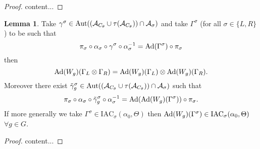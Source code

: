 \documentclass[12pt,a4paper,twoside]{article}
\let\originalleft\left
\let\originalright\right
\renewcommand{\left}{\mathopen{}\mathclose\bgroup\originalleft}
\renewcommand{\right}{\aftergroup\egroup\originalright}
\renewcommand{\AA}{\mathcal A}
\newcommand{\Ad}[1]{\textrm{Ad}\left(#1\right)}
\newcommand{\Aut}[1]{\textrm{Aut}\left(#1\right)}
\theoremstyle{definition}
\newtheorem{lemma}[theorem]{Lemma}
\numberwithin{equation}{section}
\begin{document}
\begin{proof}
	content...
\end{proof}
\begin{lemma}\label{lem:AdjointOverConeIsInCone}
	Take $\gamma^{\sigma}\in\Aut{(\AA_{C_\theta}\cup\tau(\AA_{C_\theta}))\cap\AA_{\sigma}}$ and take $\Gamma^{\sigma}$ (for all $\sigma\in\{L,R\}$) to be such that
	\begin{equation}
		\pi_{\sigma}\circ\alpha_{\sigma}\circ\gamma^{\sigma}\circ\alpha_{\sigma}^{-1}= \Ad{\Gamma^{\sigma}}\circ\pi_{\sigma}
	\end{equation}
	then
	\begin{equation}
		\Ad{W_g}(\Gamma_{L}\otimes\Gamma_{R})=\Ad{W_g}(\Gamma_L)\otimes\Ad{W_g}(\Gamma_{R}).
	\end{equation}
	Moreover there exist $\tilde\gamma^{\sigma}_g\in\Aut{(\AA_{C_\theta}\cup\tau(\AA_{C_\theta}))\cap\AA_{\sigma}}$ such that
	\begin{equation}
		\pi_{\sigma}\circ\alpha_{\sigma}\circ\tilde\gamma^{\sigma}_g\circ\alpha_{\sigma}^{-1}= \Ad{\Ad{W_g}(\Gamma^{\sigma})}\circ\pi_{\sigma}.
	\end{equation}
	If more generally we take $\Gamma^\sigma\in\textrm{IAC}_\sigma(\alpha_0,\Theta)$ then $\Ad{W_g}(\Gamma^\sigma)\in\textrm{IAC}_\sigma(\alpha_0,\Theta)$ $\forall g\in G$.
\end{lemma}
\begin{proof}
	content...
\end{proof}
\end{document}

